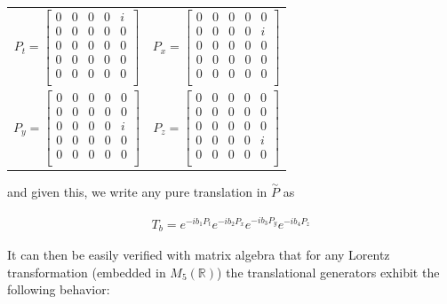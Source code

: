 \documentclass[10pt]{ucthesis}
\newcommand{\R}{\mathbb{R}}
\begin{document}
\begin{center}
\begin{tabular}{cc}
	$P_t = \begin{bmatrix}
				0 & 0 & 0 & 0 & i \\
				0 & 0 & 0 & 0 & 0\\
				0 & 0 & 0 & 0 & 0\\
				0 & 0 & 0 & 0 & 0\\
				0 & 0 & 0 & 0 & 0\\
			\end{bmatrix}$ &
	$P_x = \begin{bmatrix}
				0 & 0 & 0 & 0 & 0 \\
				0 & 0 & 0 & 0 & i\\
				0 & 0 & 0 & 0 & 0\\
				0 & 0 & 0 & 0 & 0\\
				0 & 0 & 0 & 0 & 0\\
			\end{bmatrix}$ \\
	$P_y = \begin{bmatrix}
				0 & 0 & 0 & 0 & 0 \\
				0 & 0 & 0 & 0 & 0\\
				0 & 0 & 0 & 0 & i\\
				0 & 0 & 0 & 0 & 0\\
				0 & 0 & 0 & 0 & 0\\
			\end{bmatrix}$ &
	$P_z = \begin{bmatrix}
				0 & 0 & 0 & 0 & 0 \\
				0 & 0 & 0 & 0 & 0\\
				0 & 0 & 0 & 0 & 0\\
				0 & 0 & 0 & 0 & i\\
				0 & 0 & 0 & 0 & 0\\
			\end{bmatrix}$
\end{tabular}
\end{center}

and given this, we write any pure translation in $\overset{\sim}{P}$ as 

\begin{equation}
\begin{aligned}
	T_b = e^{-ib_1P_t}e^{-ib_2P_x}e^{-ib_3P_y}e^{-ib_4P_z}
\end{aligned}
\end{equation}

It can then be easily verified with matrix algebra that for any Lorentz transformation (embedded in $M_5(\R)$) the translational generators exhibit the following behavior:
\end{document}
